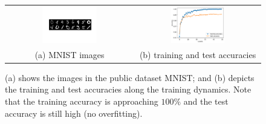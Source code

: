 %
%
%
%
%
%

\begin{figure}
\centering
\begin{tabular}{cc}
\includegraphics[width = 0.45\textwidth]{MNIST.pdf} & \includegraphics[width = 0.45\textwidth]{train_test_accuracy.pdf}    \tabularnewline
(a) MNIST images & (b) training and test accuracies
\end{tabular}
\caption{(a) shows the images in the public dataset MNIST; and (b) depicts the training and test accuracies along the training dynamics. Note that the training accuracy is approaching $100\%$ and the test accuracy is still high (no overfitting). }\label{fig:mnist}
\end{figure}



